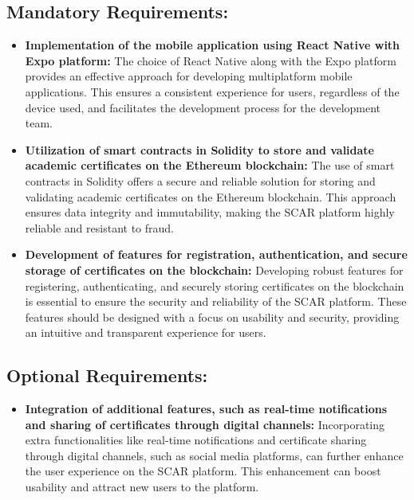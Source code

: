 \subsection{Mandatory Requirements:}

\begin{itemize}

    \item \textbf{Implementation of the mobile application using React Native with Expo platform:} The choice of React Native along with the Expo platform provides an effective approach for developing multiplatform mobile applications. This ensures a consistent experience for users, regardless of the device used, and facilitates the development process for the development team.

    \item \textbf{Utilization of smart contracts in Solidity to store and validate academic certificates on the Ethereum blockchain:} The use of smart contracts in Solidity offers a secure and reliable solution for storing and validating  academic certificates on the Ethereum blockchain. This approach ensures data integrity and immutability, making the SCAR platform highly reliable and resistant to fraud.

    \item \textbf{Development of features for registration, authentication, and secure storage of certificates on the blockchain:} Developing robust features for registering, authenticating, and securely storing certificates on the blockchain is essential to ensure the security and reliability of the SCAR platform. These features should be designed with a focus on usability and security, providing an intuitive and transparent experience for users.

\end{itemize}

\subsection{Optional Requirements:}

\begin{itemize}

    \item \textbf{Integration of additional features, such as real-time notifications and sharing of certificates through digital channels:} Incorporating extra functionalities like real-time notifications and certificate sharing through digital channels, such as social media platforms, can further enhance the user experience on the SCAR platform. This enhancement can boost usability and attract new users to the platform.

\end{itemize}

